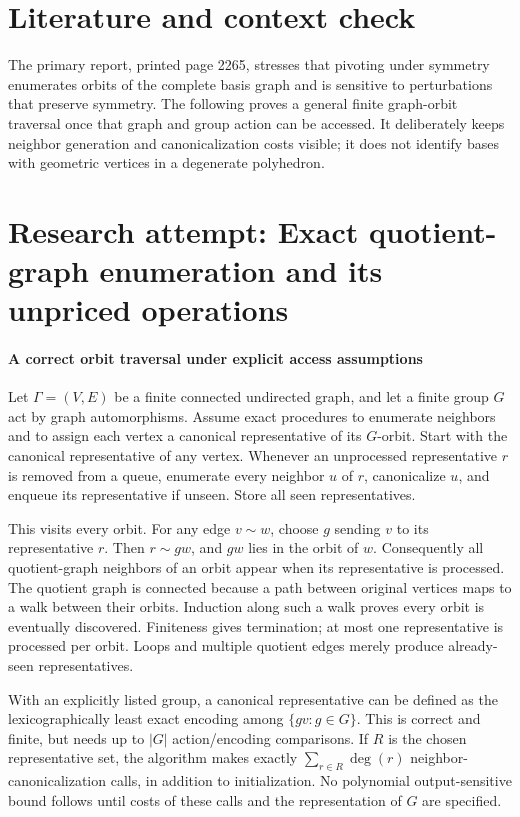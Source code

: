 \documentclass[11pt]{article}
\begin{document}
\section{Literature and context check}
The primary report, printed page 2265, stresses that pivoting under symmetry enumerates orbits of the complete basis graph and is sensitive to perturbations that preserve symmetry. The following proves a general finite graph-orbit traversal once that graph and group action can be accessed. It deliberately keeps neighbor generation and canonicalization costs visible; it does not identify bases with geometric vertices in a degenerate polyhedron.
\section{Research attempt: Exact quotient-graph enumeration and its unpriced operations}

\paragraph{A correct orbit traversal under explicit access assumptions}
Let $\Gamma=(V,E)$ be a finite connected undirected graph, and let a finite group $G$ act by graph automorphisms. Assume exact procedures to enumerate neighbors and to assign each vertex a canonical representative of its $G$-orbit. Start with the canonical representative of any vertex. Whenever an unprocessed representative $r$ is removed from a queue, enumerate every neighbor $u$ of $r$, canonicalize $u$, and enqueue its representative if unseen. Store all seen representatives.

This visits every orbit. For any edge $v\sim w$, choose $g$ sending $v$ to its representative $r$. Then $r\sim gw$, and $gw$ lies in the orbit of $w$. Consequently all quotient-graph neighbors of an orbit appear when its representative is processed. The quotient graph is connected because a path between original vertices maps to a walk between their orbits. Induction along such a walk proves every orbit is eventually discovered. Finiteness gives termination; at most one representative is processed per orbit. Loops and multiple quotient edges merely produce already-seen representatives.

With an explicitly listed group, a canonical representative can be defined as the lexicographically least exact encoding among $\{gv:g\in G\}$. This is correct and finite, but needs up to $|G|$ action/encoding comparisons. If $R$ is the chosen representative set, the algorithm makes exactly $\sum_{r\in R}\deg(r)$ neighbor-canonicalization calls, in addition to initialization. No polynomial output-sensitive bound follows until costs of these calls and the representation of $G$ are specified.
\end{document}
